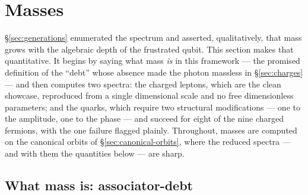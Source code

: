 
\section{Masses}
\label{sec:masses}

\S\ref{sec:generations} enumerated the spectrum and asserted, qualitatively, that mass grows with
the algebraic depth of the frustrated qubit. This section makes that quantitative. It begins by saying
what mass \emph{is} in this framework --- the promised definition of the ``debt'' whose absence made
the photon massless in \S\ref{sec:charges} --- and then computes two spectra: the charged leptons,
which are the clean showcase, reproduced from a single dimensional scale and no free dimensionless
parameters; and the quarks, which require two structural modifications --- one to the amplitude, one
to the phase --- and succeed for eight of the nine charged fermions, with the one failure flagged
plainly. Throughout, masses are computed on the canonical orbits of \S\ref{sec:canonical-orbits},
where the reduced spectra --- and with them the quantities below --- are sharp.

\subsection{What mass is: associator-debt}

